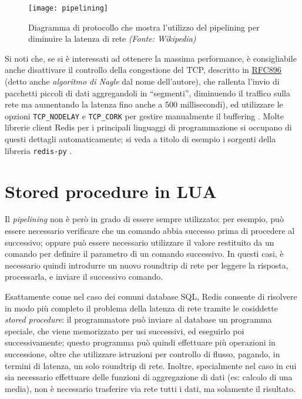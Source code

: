 \begin{figure}
	\centering
		\texttt{[image: pipelining]}
	\caption{Diagramma di protocollo che mostra l'utilizzo del pipelining per diminuire la latenza
	di rete \emph{(Fonte: Wikipedia)}}
\end{figure}

Si noti che, se si è interessati ad ottenere la massima performance, è consigliabile anche
disattivare il controllo della congestione del TCP, descritto in
\href{https://tools.ietf.org/html/rfc896}{RFC896} (detto anche \emph{algoritmo di Nagle} dal nome
dell'autore), che rallenta l'invio di pacchetti piccoli di dati aggregandoli in ``segmenti'',
diminuendo il traffico sulla rete ma aumentando la latenza fino anche a 500 millisecondi), ed
utilizzare le opzioni \verb|TCP_NODELAY| e \verb|TCP_CORK| per gestire manualmente il buffering
\cite{tcp-cork}. Molte librerie client Redis per i principali linguaggi di programmazione si
occupano di questi dettagli automaticamente; si veda a titolo di esempio i sorgenti della libreria
\verb|redis-py| \cite{tcp-cork-redispy}.

\section{Stored procedure in LUA}
\label{redislua}

Il \emph{pipelining} non è però in grado di essere sempre utilizzato: per esempio, può essere
necessario verificare che un comando abbia successo prima di procedere al successivo; oppure
può essere necessario utilizzare il valore restituito da un comando per definire il parametro 
di un comando successivo. In questi casi, è necessario quindi introdurre un nuovo roundtrip di
rete per leggere la risposta, processarla, e inviare il successivo comando.

Esattamente come nel caso dei comuni database SQL, Redis consente di risolvere in modo più completo
il problema della latenza di rete tramite le cosiddette \emph{stored procedure}: il programmatore
può inviare al database un programma speciale, che viene memorizzato per usi successivi, ed
eseguirlo poi successivamente; questo programma può quindi effettuare più operazioni in successione,
oltre che utilizzare istruzioni per controllo di flusso, pagando, in termini di latenza, un solo
roundtrip di rete. Inoltre, specialmente nel caso in cui sia necessario effettuare delle funzioni di
aggregazione di dati (es: calcolo di una media), non è necessario trasferire via rete tutti i dati,
ma solamente il risultato.

